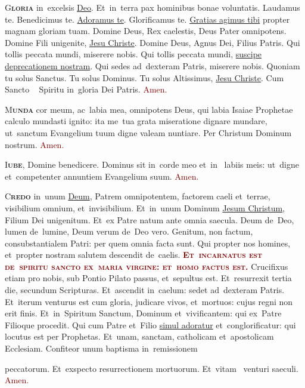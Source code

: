 \documentclass[12pt, landscape]{scrartcl}
\newcommand{\cross}{\textcolor{red}{\raisebox{-1mm}{\scalebox{1.5}{\ding{64}}}}}
\newcommand{\amen}{\textcolor{Maroon}{Amen.}}
\newcommand{\initial}[2]{\lettrine[lines=3]{\color{Maroon}#1}{\bfseries\color{Maroon}#2}}
\newcommand{\gap}{\vspace{0.3cm}}
\newcommand{\bend}[1]{\ul{#1}}
\begin{document}
\thispagestyle{empty}

\pagecolor{fondpaille}
\color{darkgreen}
\large

\begin{center}

	\begin{minipage}[t]{0.29\linewidth}

		\vspace*{2.2cm}

		\initial{\hspace*{2cm}G}{loria} in~excelsis \bend{Deo}. Et~in~terra pax
		hominibus bonae voluntatis. Laudamus te. Benedicimus te. \bend{Adoramus
			te}. Glorificamus te. \bend{Gratias agimus tibi} propter magnam gloriam
		tuam. Domine Deus, Rex caelestis, Deus Pater omnipotens. Domine Fili
		unigenite, \bend{Jesu Christe}. Domine Deus, Agnus Dei, Filius Patris.
		Qui tollis peccata mundi, miserere nobis. Qui tollis peccata mundi,
		\bend{suscipe deprecationem nostram}. Qui sedes ad~dexteram Patris,
		miserere nobis. Quoniam tu solus Sanctus. Tu solus Dominus. Tu solus
		Altissimus, \bend{Jesu Christe}. Cum Sancto \cross~ Spiritu in~gloria
		Dei Patris. \amen

		\gap

		\initial{M}{unda} cor meum, ac~labia mea, omnipotens Deus, qui labia
		Isaiae Prophetae calculo mundasti ignito: ita me~tua grata miseratione
		dignare mundare, ut~sanctum Evangelium tuum digne valeam nuntiare. Per
		Christum Dominum nostrum. \amen

		\gap

		\initial{I}{ube}, Domine benedicere. Dominus sit in~corde meo et~in~
		labiis meis: ut~digne et~competenter annuntiem Evangelium suum. \amen

		\gap

		\initial{C}{redo} in~unum \bend{Deum}, Patrem omnipotentem, factorem
		caeli et~terrae, visibilium omnium, et~invisibilium. Et~in~unum Dominum
		\bend{Jesum Christum}, Filium Dei unigenitum. Et~ex Patre natum ante
		omnia saecula. Deum de~Deo, lumen de~lumine, Deum verum de~Deo vero.
		Genitum, non factum, consubstantialem Patri: per quem omnia facta sunt.
		Qui propter nos homines, et~propter nostram salutem descendit de~caelis.
		\textcolor{Maroon}{\bfseries\scshape Et~incarnatus est de~spiritu sancto
			ex~maria virgine: et~homo factus est.} Crucifixus etiam pro nobis, sub
		Pontio Pilato passus, et~sepultus est. Et~resurrexit tertia die,
		secundum Scripturas. Et~ascendit in~caelum: sedet ad~dexteram Patris.
		Et~iterum venturus est cum gloria, judicare vivos, et~mortuos: cujus
		regni non erit finis. Et~in~Spiritum Sanctum, Dominum et~vivificantem:
		qui ex~Patre Filioque procedit. Qui cum Patre et~Filio \bend{simul
			adoratur} et~conglorificatur: qui locutus est per Prophetas. Et~unam,
		sanctam, catholicam et~apostolicam Ecclesiam. Confiteor unum baptisma
		in~remissionem
		\hspace*{2cm} \parbox{0.85\linewidth}{ \smallskip peccatorum.
			Et~exspecto resurrectionem mortuorum. Et~vitam \cross~venturi saeculi.
			\amen}


\end{minipage}
\end{center}
\end{document}
